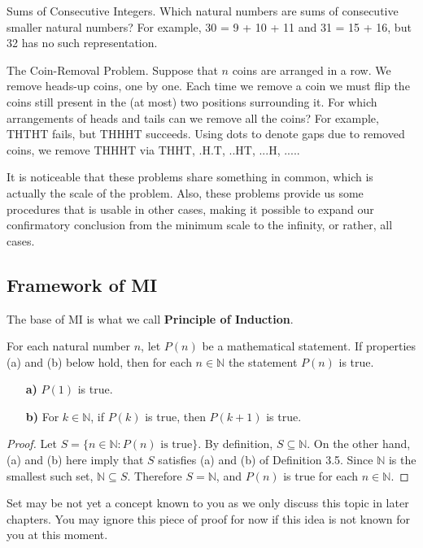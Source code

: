 \documentclass[
	12pt, %
	fleqn, %
	a4paper, %
]{LegrandOrangeBook}
\begin{document}
\begin{problem}
Sums of Consecutive Integers. Which natural numbers are sums of consecutive smaller natural numbers? For example, 30 = 9 + 10 + 11 and 31 = 15 + 16, but 32 has no such representation.
\end{problem}

\begin{problem}
The Coin-Removal Problem. Suppose that \( n \) coins are arranged in a row. We remove heads-up coins, one by one. Each time we remove a coin we must flip the coins still present in the (at most) two positions surrounding it. For which arrangements of heads and tails can we remove all the coins? For example, \( \text{THTHT} \) fails, but \( \text{THHHT} \) succeeds. Using dots to denote gaps due to removed coins, we remove \( \text{THHHT} \) via \( \text{THHT} \), \( \text{.H.T} \), \( \text{..HT} \), \( \text{...H} \), \( \text{....} \).
\end{problem}

It is noticeable that these problems share something in common, which is actually the scale of the problem. Also, these problems provide us some procedures that is usable in other cases, making it possible to expand our confirmatory conclusion from the minimum scale to the infinity, or rather, all cases. 

\subsection{Framework of MI}
The base of MI is what we call \textbf{Principle of Induction}.
\begin{theorem}
For each natural number \( n \), let \( P(n) \) be a mathematical statement. If properties (a) and (b) below hold, then for each \( n \in \mathbb{N} \) the statement \( P(n) \) is true.
\begin{enumerate}
    \item[\textbf{a)}] \( P(1) \) is true.
    \item[\textbf{b)}] For \( k \in \mathbb{N} \), if \( P(k) \) is true, then \( P(k + 1) \) is true.
\end{enumerate}
\end{theorem}

\begin{proof}
Let \( S = \{n \in \mathbb{N} : P(n) \text{ is true}\} \). By definition, \( S \subseteq \mathbb{N} \). On the other hand, (a) and (b) here imply that \( S \) satisfies (a) and (b) of Definition 3.5. Since \( \mathbb{N} \) is the smallest such set, \( \mathbb{N} \subseteq S \). Therefore \( S = \mathbb{N} \), and \( P(n) \) is true for each \( n \in \mathbb{N} \).
\end{proof}
\begin{remark}
    Set may be not yet a concept known to you as we only discuss this topic in later chapters. You may ignore this piece of proof for now if this idea is not known for you at this moment.
\end{remark}
\end{document}
